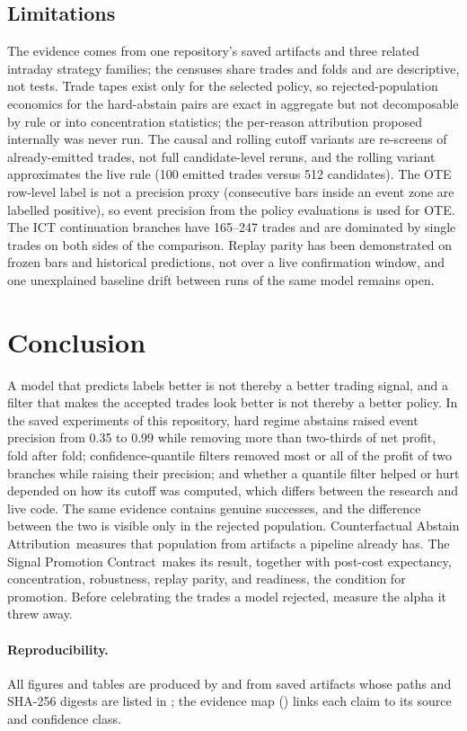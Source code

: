 \documentclass[10pt]{article}
\newcommand{\CAA}{Counterfactual Abstain Attribution}
\newcommand{\SPC}{Signal Promotion Contract}
\begin{document}
\subsection{Limitations}

The evidence comes from one repository's saved artifacts and three related intraday strategy families; the censuses share trades and folds and are descriptive, not tests. Trade tapes exist only for the selected policy, so rejected-population economics for the hard-abstain pairs are exact in aggregate but not decomposable by rule or into concentration statistics; the per-reason attribution proposed internally was never run. The causal and rolling cutoff variants are re-screens of already-emitted trades, not full candidate-level reruns, and the rolling variant approximates the live rule (100 emitted trades versus 512 candidates). The OTE row-level label is not a precision proxy (consecutive bars inside an event zone are labelled positive), so event precision from the policy evaluations is used for OTE. The ICT continuation branches have 165--247 trades and are dominated by single trades on both sides of the comparison. Replay parity has been demonstrated on frozen bars and historical predictions, not over a live confirmation window, and one unexplained baseline drift between runs of the same model remains open.

\section{Conclusion}

A model that predicts labels better is not thereby a better trading signal, and a filter that makes the accepted trades look better is not thereby a better policy. In the saved experiments of this repository, hard regime abstains raised event precision from 0.35 to 0.99 while removing more than two-thirds of net profit, fold after fold; confidence-quantile filters removed most or all of the profit of two branches while raising their precision; and whether a quantile filter helped or hurt depended on how its cutoff was computed, which differs between the research and live code. The same evidence contains genuine successes, and the difference between the two is visible only in the rejected population. \CAA\ measures that population from artifacts a pipeline already has. The \SPC\ makes its result, together with post-cost expectancy, concentration, robustness, replay parity, and readiness, the condition for promotion. Before celebrating the trades a model rejected, measure the alpha it threw away.

\paragraph{Reproducibility.} All figures and tables are produced by  and  from saved artifacts whose paths and SHA-256 digests are listed in ; the evidence map () links each claim to its source and confidence class.



\end{document}
